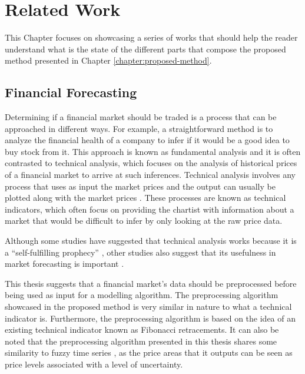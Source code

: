 \chapter{Related Work}
\label{chapter:related-work}

This Chapter focuses on showcasing a series of works that should help the reader
understand what is the state of the different parts that compose the proposed
method presented in Chapter \ref{chapter:proposed-method}.

\section{Financial Forecasting}
\label{section:financial-forecasting}

Determining if a financial market should be traded is a process that can be
approached in different ways. For example, a straightforward method is to
analyze the financial health of a company to infer if it would be a good idea to
buy stock from it. This approach is known as fundamental analysis
\cite{Martinez-Jaramillo2009} and it is often contrasted to technical analysis,
which focuses on the analysis of historical prices of a financial market to
arrive at such inferences. Technical analysis involves any process that uses as
input the market prices and the output can usually be plotted along with the
market prices \cite{Achelis2000}. These processes are known as technical
indicators, which often focus on providing the chartist with information about a
market that would be difficult to infer by only looking at the raw price data.

Although some studies have suggested that technical analysis works because it is a
``self-fulfilling prophecy'' \cite{Salganik2008} \cite{Fund1992}, other studies
also suggest that its usefulness in market forecasting is important
\cite{Kadiri2015} \cite{Fund1992}.

This thesis suggests that a financial market's data should be preprocessed
before being used as input for a modelling algorithm. The preprocessing
algorithm showcased in the proposed method is very similar in nature to what a
technical indicator is. Furthermore, the preprocessing algorithm is based on the
idea of an existing technical indicator known as Fibonacci retracements. It can
also be noted that the preprocessing algorithm presented in this thesis shares
some similarity to fuzzy time series \cite{Cai2013}, as the price areas that it
outputs can be seen as price levels associated with a level of uncertainty.

